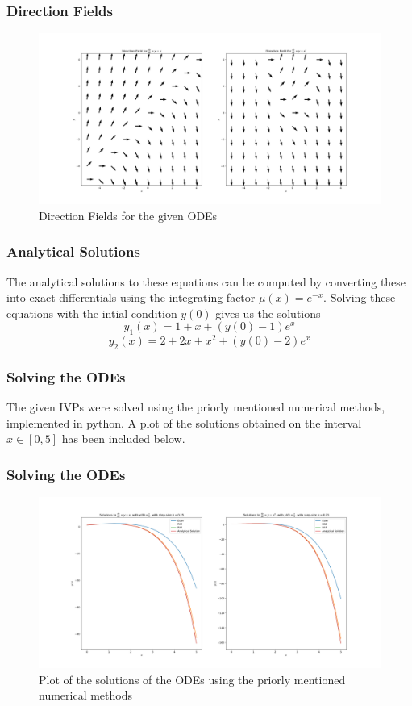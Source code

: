 \documentclass{beamer}
\begin{document}
\begin{frame}
    \frametitle{Direction Fields}
    \begin{figure}[h]
        \centering
        \includegraphics[width=\linewidth]{"direction_fields.png"}
        \caption{Direction Fields for the given ODEs}
    \end{figure}
\end{frame}
\begin{frame}
    \frametitle{Analytical Solutions}
    The analytical solutions to these equations can be computed by converting these into exact differentials using the integrating factor $\mu(x) = e^{-x}$. Solving these equations with the intial condition $y(0)$ gives us the solutions
    $$\boxed{y_1(x) = 1 + x + (y(0) - 1)e^x}$$
    $$\boxed{y_2(x) = 2 + 2x + x^2 + (y(0) - 2)e^x}$$
\end{frame}

\begin{frame}
    \frametitle{Solving the ODEs}
    The given IVPs were solved using the priorly mentioned numerical methods, implemented in python.
    A plot of the solutions obtained on the interval $x \in [0, 5]$ has been included below.
\end{frame}

\begin{frame}
    \frametitle{Solving the ODEs}
    \begin{figure}[h]
        \centering
        \includegraphics[width=\linewidth]{"solutions.png"}
        \caption{Plot of the solutions of the ODEs using the priorly mentioned numerical methods}
    \end{figure}
\end{frame}
\end{document}
